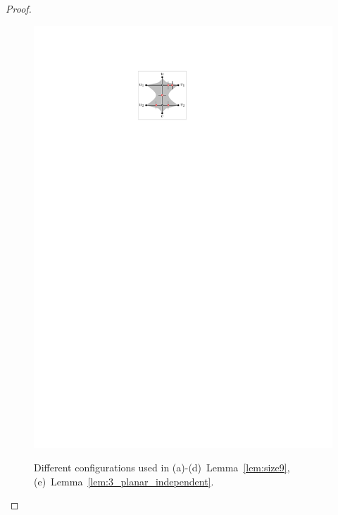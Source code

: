 \begin{proof}
\begin{figure}[t!]
\begin{minipage}[b]{.19\textwidth}
        \includegraphics[width=\textwidth,page=1]{images/3planar_independent}
        \subcaption{~}\label{fig:independent}
    \end{minipage}
    \caption{%
    Different configurations used in  
    (a)-(d)~Lemma~\ref{lem:size9}, 
    (e)~Lemma~\ref{lem:3_planar_independent}.}
    \label{fig:replacements_2}
\end{figure}


\end{proof}
